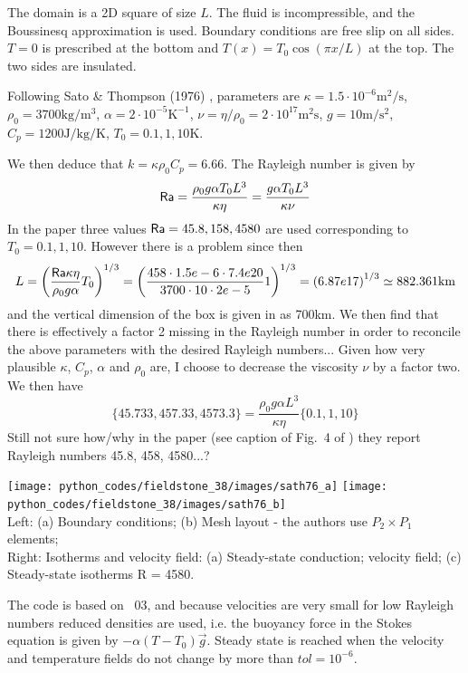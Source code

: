The domain is a 2D square of size $L$. The fluid is incompressible, and the Boussinesq 
approximation is used. Boundary conditions are free slip on all sides. $T=0$ is prescribed 
at the bottom and $T(x)=T_0 \cos (\pi x/L)$ at the top. The two sides are insulated.

Following Sato \& Thompson (1976) \cite{sath76}, 
parameters are $\kappa=1.5\cdot 10^{-6}\si{\square\m\per\second}$, 
$\rho_0=3700\si{\kg\per\cubic\metre}$, $\alpha=2\cdot 10^{-5}\si{\kelvin}^{-1}$, 
$\nu=\eta/\rho_0=2\cdot10^{17} \si{\square\metre\second}$, $g=10\si{\metre\per\square\second}$, 
$C_p=1200 \si{\joule\per\kg\per\kelvin}$, $T_0=0.1,1,10\si{\kelvin}$.  

We then deduce that $k=\kappa \rho_0 C_p = 6.66$. The Rayleigh number is given by
\[
{\mathsf{Ra}} 
= \frac{ \rho_0 g \alpha T_0 L^3  }{\kappa \eta}
= \frac{  g \alpha T_0 L^3  }{\kappa \nu}
\]
In the paper three values ${\mathsf{Ra}}=45.8,158,4580$ are used  corresponding to $T_0=0.1,1,10$. 
However there is a problem since then 
\[
L = \left( \frac{{\mathsf{Ra}} \kappa \eta}{\rho_0 g \alpha } T_0   \right)^{1/3}
= \left( \frac{458\cdot 1.5e-6\cdot 7.4e20}{3700\cdot 10\cdot 2e-5 } 1   \right)^{1/3}
= \left( 6.87e17 \right)^{1/3}
\simeq 882.361 \si{\kilo\metre}
\]
and the vertical dimension of the box is given in \cite{mcrw74} as 700\si{\km}. 
We then find that there is effectively a factor 2 missing in the Rayleigh number in order
to reconcile the above parameters with the desired Rayleigh numbers... 
Given how very plausible $\kappa$, $C_p$, $\alpha$ and $\rho_0$ are, I choose to 
decrease the viscosity $\nu$ by a factor two.
We then have 
\[
\{ 45.733, 457.33, 4573.3 \} = \frac{ \rho_0 g \alpha  L^3  }{\kappa \eta} \{ 0.1, 1, 10\}
\]
Still not sure how/why in the paper (see caption of Fig.~4 of \cite{mcrw74}) 
they report Rayleigh numbers 45.8, 458, 4580...?

\begin{center}
\texttt{[image: python\_codes/fieldstone\_38/images/sath76\_a]}
\texttt{[image: python\_codes/fieldstone\_38/images/sath76\_b]}\\
{\captionfont Left: (a) Boundary conditions; (b) Mesh layout - the authors
use $P_2\times P_1$ elements;\\
Right: Isotherms and velocity field: (a) Steady-state conduction;
velocity field; (c) Steady-state isotherms R = 4580.}
\end{center}

The code is based on \stone~03, and because velocities are very small for low Rayleigh numbers
reduced densities are used, i.e. the buoyancy force in the Stokes equation is given by $-\alpha(T-T_0)\vec{g}$.
Steady state is reached when the velocity and temperature fields do not change by more than $tol=10^{-6}$.

